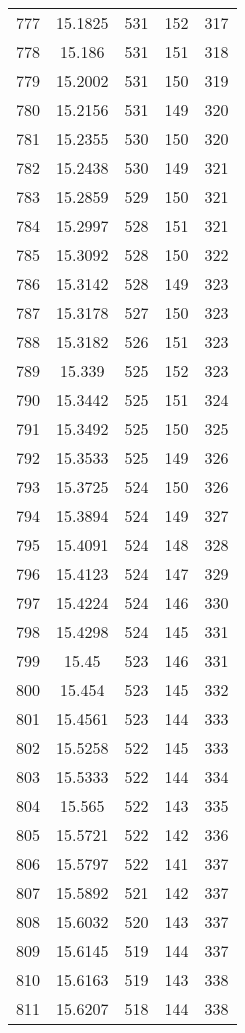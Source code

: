 \documentclass[12pt,a4paper]{article}
\begin{document}
\begin{tabular}{r|cccc}
	777 & 15.1825 & 531 & 152 & 317 \\
	778 & 15.186 & 531 & 151 & 318 \\
	779 & 15.2002 & 531 & 150 & 319 \\
	780 & 15.2156 & 531 & 149 & 320 \\
	781 & 15.2355 & 530 & 150 & 320 \\
	782 & 15.2438 & 530 & 149 & 321 \\
	783 & 15.2859 & 529 & 150 & 321 \\
	784 & 15.2997 & 528 & 151 & 321 \\
	785 & 15.3092 & 528 & 150 & 322 \\
	786 & 15.3142 & 528 & 149 & 323 \\
	787 & 15.3178 & 527 & 150 & 323 \\
	788 & 15.3182 & 526 & 151 & 323 \\
	789 & 15.339 & 525 & 152 & 323 \\
	790 & 15.3442 & 525 & 151 & 324 \\
	791 & 15.3492 & 525 & 150 & 325 \\
	792 & 15.3533 & 525 & 149 & 326 \\
	793 & 15.3725 & 524 & 150 & 326 \\
	794 & 15.3894 & 524 & 149 & 327 \\
	795 & 15.4091 & 524 & 148 & 328 \\
	796 & 15.4123 & 524 & 147 & 329 \\
	797 & 15.4224 & 524 & 146 & 330 \\
	798 & 15.4298 & 524 & 145 & 331 \\
	799 & 15.45 & 523 & 146 & 331 \\
	800 & 15.454 & 523 & 145 & 332 \\
	801 & 15.4561 & 523 & 144 & 333 \\
	802 & 15.5258 & 522 & 145 & 333 \\
	803 & 15.5333 & 522 & 144 & 334 \\
	804 & 15.565 & 522 & 143 & 335 \\
	805 & 15.5721 & 522 & 142 & 336 \\
	806 & 15.5797 & 522 & 141 & 337 \\
	807 & 15.5892 & 521 & 142 & 337 \\
	808 & 15.6032 & 520 & 143 & 337 \\
	809 & 15.6145 & 519 & 144 & 337 \\
	810 & 15.6163 & 519 & 143 & 338 \\
	811 & 15.6207 & 518 & 144 & 338 \\

\end{tabular}
\end{document}
